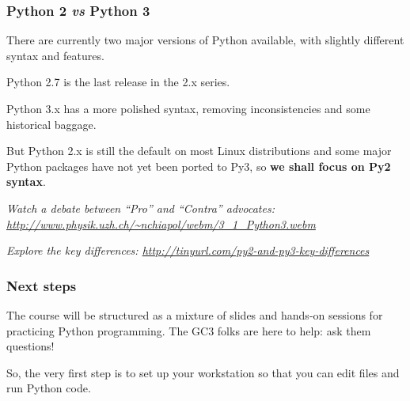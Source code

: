 \documentclass[english,serif,mathserif,xcolor=pdftex,dvipsnames,table]{beamer}
\begin{document}
\begin{frame}[fragile]
  \frametitle{Python 2 \emph{vs} Python 3}

  There are currently two major versions of Python available, with
  slightly different syntax and features.

  \+
  Python 2.7 is the last release in the 2.x series.

  \+
  Python 3.x has a more polished syntax, removing inconsistencies and
  some historical baggage.

  \+
  But Python 2.x is still the default on most Linux distributions
  and some major Python packages have not yet been ported to Py3, so
  \textbf{we shall focus on Py2 syntax}.

  \+
  {\footnotesize\em
    Watch a debate between ``Pro'' and ``Contra'' advocates:
    \url{http://www.physik.uzh.ch/~nchiapol/webm/3_1_Python3.webm}}

  \+
  {\footnotesize\em
    Explore the key differences:
    \url{http://tinyurl.com/py2-and-py3-key-differences}}
\end{frame}


\begin{frame}
  \frametitle{Next steps}

  The course will be structured as a mixture of slides and hands-on
  sessions for practicing Python programming.  The GC3 folks are here
  to help: ask them questions!

  \+
  So, the very first step is to set up your workstation so that you
  can edit files and run Python code.
\end{frame}
\end{document}
